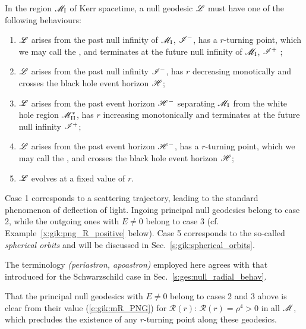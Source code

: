 \begin{greybox}
In the region $\mathscr{M}_{\rm I}$ of Kerr spacetime,
a null geodesic $\mathscr{L}$ must have one of the following behaviours:
\begin{enumerate}
\item $\mathscr{L}$ arises from the past null infinity of $\mathscr{M}_{\rm I}$, $\mathscr{I}^-$, has a $r$-turning point,
which we may call the , and terminates at the future null infinity
of $\mathscr{M}_{\rm I}$, $\mathscr{I}^+$ ;
\item $\mathscr{L}$ arises from the past null infinity $\mathscr{I}^-$, has $r$ decreasing
monotically and crosses the black hole event horizon $\mathscr{H}$;
\item $\mathscr{L}$ arises from the past event horizon $\mathscr{H}^-$ separating $\mathscr{M}_{\rm I}$
from the white hole region $\mathscr{M}_{\rm II}^*$, has $r$ increasing monotonically and
terminates at the future null infinity $\mathscr{I}^+$;
\item $\mathscr{L}$ arises from the past event horizon $\mathscr{H}^-$, has a $r$-turning point,
which we may call the , and crosses the black hole event horizon $\mathscr{H}$;
\item $\mathscr{L}$ evolves at a fixed value of $r$.
\end{enumerate}
\end{greybox}
Case 1 corresponds to a scattering trajectory, leading to the standard phenomenon of deflection of light.
Ingoing principal null geodesics belong to case 2, while the outgoing ones with $E\neq 0$ belong to case 3
(cf. Example~\ref{x:gik:png_R_positive} below).
Case 5 corresponds to the so-called \emph{spherical orbits} and will be discussed in Sec.~\ref{s:gik:spherical_orbits}.

\begin{remark}
The terminology  \emph{(periastron, apoastron)} employed here agrees with that
introduced for the Schwarzschild case in Sec.~\ref{s:ges:null_radial_behav}.
\end{remark}

\begin{example} \label{x:gik:png_R_positive}
That the principal null geodesics with $E\neq 0$ belong to cases 2 and 3 above
is clear from their value (\ref{e:gik:mR_PNG}) for $\mathcal{R}(r)$:
$\mathcal{R}(r) = \rho^4 > 0$ in all $\mathscr{M}$, which precludes the existence
of any $r$-turning point along these geodesics.
\end{example}


